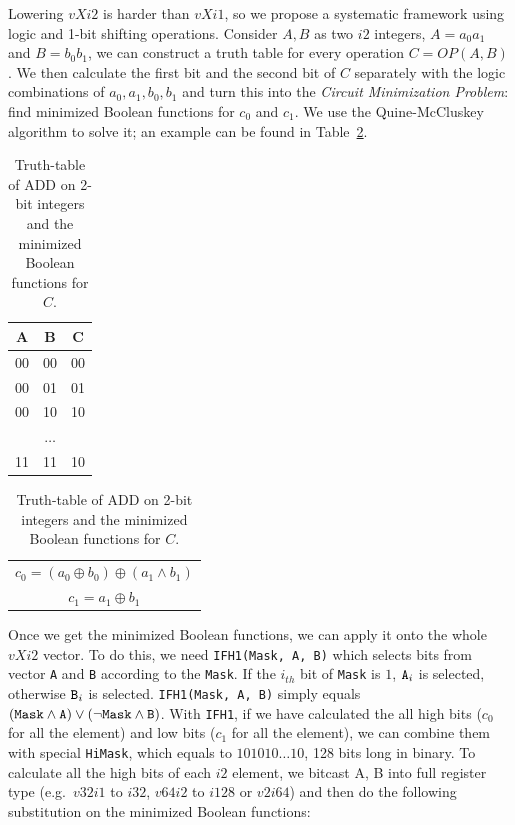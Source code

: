 Lowering $vXi2$ is harder than $vXi1$, so we propose a systematic framework using logic and 1-bit shifting operations. Consider $A, B$ as two $i2$ integers, $A=a_0a_1$ and $B=b_0b_1$, we can construct a truth table for every operation $C = OP(A, B)$. We then calculate the first bit and the second bit of $C$ separately with the logic combinations of $a_0, a_1, b_0, b_1$ and turn this into the \textit{Circuit Minimization Problem}: find minimized Boolean functions for $c_0$ and $c_1$. We use the Quine-McCluskey algorithm\cite{johnson1981quine} to solve it; an example can be found in Table~\ref{table:quine}.

\begin{table}[h]
  \centering
  \begin{tabular}{ccc}
    \hline
    A                   & B                   & C                  \\ \hline
    00                  & 00                  & 00                 \\
    00                  & 01                  & 01                 \\
    00                  & 10                  & 10                 \\
    \multicolumn{3}{c}{$\ldots$}                                        \\
    11                  & 11                  & 10                 \\ \hline
  \end{tabular}

  \begin{tabular}{lll}
    \\
    \multicolumn{3}{c}{$c_0 = (a_0 \oplus b_0) \oplus (a_1 \land b_1)$} \\
    \multicolumn{3}{c}{$c_1 = a_1 \oplus b_1$}
  \end{tabular}
  \caption{Truth-table of ADD on 2-bit integers and the minimized Boolean functions for $C$.}
  \label{table:quine}
\end{table}

Once we get the minimized Boolean functions, we can apply it onto the whole $vXi2$ vector. To do this, we need {\tt IFH1(Mask, A, B)} which selects bits from vector {\tt A} and {\tt B} according to the {\tt Mask}. If the $i_{th}$ bit of {\tt Mask} is $1$, $\text{\tt A}_i$ is selected, otherwise $\text{\tt B}_i$ is selected. {\tt IFH1(Mask, A, B)} simply equals $(\text{\tt Mask} \land \text{\tt A}) \lor (\lnot \text{\tt Mask} \land \text{\tt B})$. With {\tt IFH1}, if we have calculated the all high bits ($c_0$ for all the element) and low bits ($c_1$ for all the element), we can combine them with special {\tt HiMask}, which equals to $101010 \ldots 10$, 128 bits long in binary. To calculate all the high bits of each $i2$ element, we bitcast A, B into full register type (e.g.\ $v32i1$ to $i32$, $v64i2$ to $i128$ or $v2i64$) and then do the following substitution on the minimized Boolean functions:

